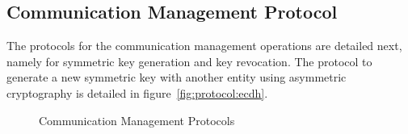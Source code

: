 %
%
\subsection{Communication Management Protocol}\label{chap:implementation:protocol:key}

The protocols for the communication management operations are detailed next, namely for symmetric key generation and key revocation. 
The protocol to generate a new symmetric key with another entity using asymmetric cryptography is detailed in figure~\ref{fig:protocol:ecdh}.

\begin{figure}[h!]
	\centering
	\caption{Communication Management Protocols}
\end{figure}

